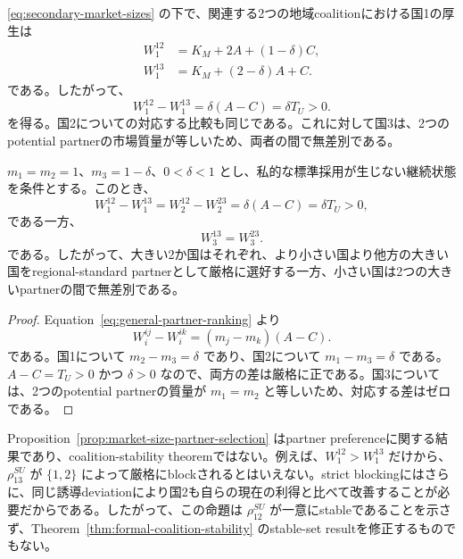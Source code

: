 \eqref{eq:secondary-market-sizes} の下で、関連する2つの地域coalitionにおける国1の厚生は
\begin{align}
    W_1^{12}
    &=K_M+2A+(1-\delta)C,
    \label{eq:w1-su12}\\
    W_1^{13}
    &=K_M+(2-\delta)A+C.
    \label{eq:w1-su13}
\end{align}
である。したがって、
\begin{equation}
    W_1^{12}-W_1^{13}
    =\delta(A-C)
    =\delta T_U>0.
    \label{eq:w1-partner-ranking}
\end{equation}
を得る。国2についての対応する比較も同じである。これに対して国3は、2つのpotential partnerの市場質量が等しいため、両者の間で無差別である。

\begin{proposition}
\label{prop:market-size-partner-selection}
$m_1=m_2=1$、$m_3=1-\delta$、$0<\delta<1$ とし、私的な標準採用が生じない継続状態を条件とする。このとき、
\begin{equation}
    \boxed{
    W_1^{12}-W_1^{13}
    =W_2^{12}-W_2^{23}
    =\delta(A-C)
    =\delta T_U>0,
    }
    \label{eq:large-country-partner-ranking}
\end{equation}
である一方、
\begin{equation}
    \boxed{
    W_3^{13}=W_3^{23}.
    }
    \label{eq:small-country-partner-indifference}
\end{equation}
である。したがって、大きい2か国はそれぞれ、より小さい国より他方の大きい国をregional-standard partnerとして厳格に選好する一方、小さい国は2つの大きいpartnerの間で無差別である。
\end{proposition}

\begin{proof}
Equation~\eqref{eq:general-partner-ranking} より
\[
    W_i^{ij}-W_i^{ik}=(m_j-m_k)(A-C).
\]
である。国1について $m_2-m_3=\delta$ であり、国2について $m_1-m_3=\delta$ である。$A-C=T_U>0$ かつ $\delta>0$ なので、両方の差は厳格に正である。国3については、2つのpotential partnerの質量が $m_1=m_2$ と等しいため、対応する差はゼロである。
\end{proof}

Proposition~\ref{prop:market-size-partner-selection} はpartner preferenceに関する結果であり、coalition-stability theoremではない。例えば、$W_1^{12}>W_1^{13}$ だけから、$\rho_{13}^{SU}$ が $\{1,2\}$ によって厳格にblockされるとはいえない。strict blockingにはさらに、同じ誘導deviationにより国2も自らの現在の利得と比べて改善することが必要だからである。したがって、この命題は $\rho_{12}^{SU}$ が一意にstableであることを示さず、Theorem~\ref{thm:formal-coalition-stability} のstable-set resultを修正するものでもない。

